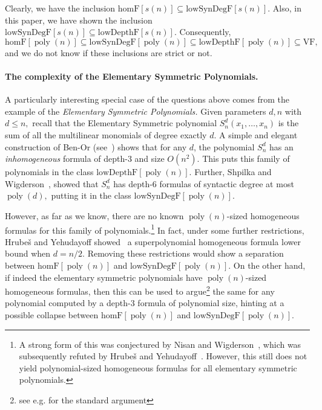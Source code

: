 \documentclass[11pt,a4paper]{article}
\newcommand{\poly}{\mathop{\mathrm{poly}}}
\begin{document}
Clearly, we have the inclusion \(\text{homF}[s(n)] \subseteq \text{lowSynDegF}[s(n)]\). Also, in this paper, we have shown the inclusion \(\text{lowSynDegF}[s(n)] \subseteq \text{lowDepthF}[s(n)]\). Consequently, 
\[\text{homF}[\poly(n)] \subseteq \text{lowSynDegF}[\poly(n)]\subseteq \text{lowDepthF}[\poly(n)] \subseteq \text{VF},
\]
and we do not know if these inclusions are strict or not. 

\paragraph{The complexity of the Elementary Symmetric Polynomials.} A particularly interesting special case of the questions above comes from the example of the \emph{Elementary Symmetric Polynomials.} Given parameters $d, n$ with $d \leq n,$ recall that the Elementary Symmetric polynomial $S_n^d(x_1,\ldots, x_n)$ is the sum of all the multilinear monomials of degree exactly $d$. A simple and elegant construction of Ben-Or (see~\cite{SW}) shows that for any $d$, the polynomial $S_n^d$ has an \emph{inhomogeneous} formula of depth-$3$ and size $O(n^2).$ This puts this family of polynomials in the class $\text{lowDepthF}[\poly(n)].$ Further, Shpilka and Wigderson~\cite[Theorem 5.3]{SW}, showed that $S_n^d$ has depth-$6$ formulas of syntactic degree at most $\poly(d),$ putting it in the class $\text{lowSynDegF}[\poly(n)].$

However, as far as we know, there are no known $\poly(n)$-sized homogeneous formulas for this family of polynomials.\footnote{A strong form of this was conjectured by Nisan and Wigderson~\cite{NW95}, which was subsequently refuted by Hrube\v{s} and Yehudayoff~\cite{HrubesY11}. However, this still does not yield polynomial-sized homogeneous formulas for all elementary symmetric polynomials.} In fact, under some further restrictions, Hrube\v{s} and Yehudayoff showed~\cite{HrubesY11} a superpolynomial homogeneous formula lower bound when $d = n/2$. Removing these restrictions would show a separation between $\text{homF}[\poly(n)]$ and $\text{lowSynDegF}[\poly(n)]$. On the other hand, if indeed the elementary symmetric polynomials have $\poly(n)$-sized homogeneous formulas, then this can be used to argue\footnote{see e.g. \cite[Section III]{LST-FOCS} for the standard argument} the same for any polynomial computed by a depth-$3$ formula of polynomial size, hinting at a possible collapse between $\text{homF}[\poly(n)]$ and $\text{lowSynDegF}[\poly(n)]$.
\end{document}
